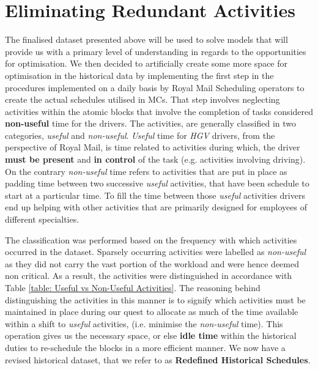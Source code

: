 
\section{Eliminating Redundant Activities}
\label{section: Redefined Dataset}
The finalised dataset presented above will be used to solve models that will provide us with a primary level of understanding in regards to the opportunities for optimisation. We then decided to artificially create some more space for optimisation in the historical data by implementing the first step in the procedures implemented on a daily basis by Royal Mail Scheduling operators to create the actual schedules utilised in MCs. That step involves neglecting activities within the atomic blocks that involve the completion of tasks considered \textbf{non-useful} time for the drivers. The activities, are generally classified in two categories, \textit{useful} and \textit{non-useful}. \textit{Useful} time for \textit{HGV} drivers, from the perspective of Royal Mail, is time related to activities during which, the driver \textbf{must be present} and \textbf{in control} of the task  (e.g. activities involving driving). On the contrary \textit{non-useful} time refers to activities that are put in place as padding time between two successive \textit{useful} activities, that have been schedule to start at a particular time. To fill the time between those \textit{useful} activities drivers end up helping with other activities that are primarily designed for employees of different specialties. 

\vspace{\baselineskip}
\noindent
The classification was performed based on the frequency with which activities occurred in the dataset. Sparsely occurring activities were labelled as \textit{non-useful} as they did not carry the vast portion of the workload and were hence deemed non critical. As a result, the activities were distinguished in accordance with Table \ref{table: Useful vs Non-Useful Activities}. The reasoning behind distinguishing the activities in this manner is to signify which activities must be maintained in place during our quest to allocate as much of the time available within a shift to \textit{useful} activities, (i.e. minimise the \textit{non-useful} time). This operation gives us the necessary space, or else \textbf{idle time} within the historical duties to re-schedule the blocks in a more efficient manner. We now have a revised historical dataset, that we refer to as \textbf{Redefined Historical Schedules}. 


